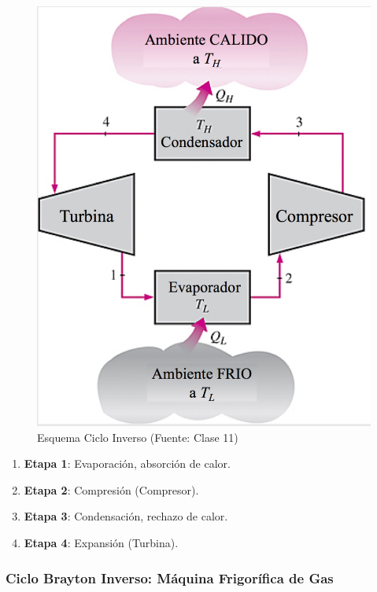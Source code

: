     \begin{multicols}{2}
        \begin{figure}
            \includegraphics[width=.8\textwidth]{img/clases/ciclo_inverso.png}
            \caption{Esquema Ciclo Inverso (Fuente: Clase 11)}
            \label{fig:ciclo_inverso}
        \end{figure}
        
        \begin{enumerate}
            \item \textbf{Etapa 1}: Evaporación, absorción de calor.
            \item \textbf{Etapa 2}: Compresión (Compresor).
            \item \textbf{Etapa 3}: Condensación, rechazo de calor.
            \item \textbf{Etapa 4}: Expansión (Turbina).
        \end{enumerate}
    \end{multicols}
    
        \subsubsection{Ciclo Brayton Inverso: Máquina Frigorífica de Gas}
        
